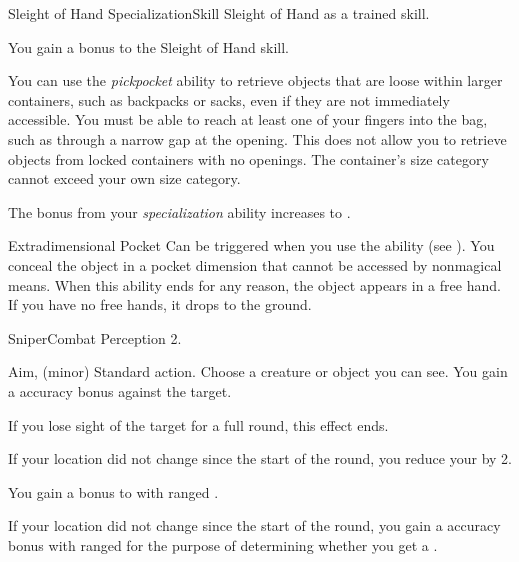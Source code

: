   \begin{feat}{Sleight of Hand Specialization}{Skill}
    \featpre Sleight of Hand as a trained skill.

     You gain a  bonus to the Sleight of Hand skill.

     You can use the \textit{pickpocket} ability to retrieve objects that are loose within larger containers, such as backpacks or sacks, even if they are not immediately accessible.
    You must be able to reach at least one of your fingers into the bag, such as through a narrow gap at the opening.
    This does not allow you to retrieve objects from locked containers with no openings.
    The container's size category cannot exceed your own size category.

     The bonus from your \textit{specialization} ability increases to .

    \begin{magicalattuneability}{Extradimensional Pocket}{}
      \abilityusagetime Can be triggered when you use the  ability (see ).
      \rankline
      You conceal the object in a pocket dimension that cannot be accessed by nonmagical means.
      When this ability ends for any reason, the object appears in a free hand.
      If you have no free hands, it drops to the ground.
    \end{magicalattuneability}
  \end{feat}

  \begin{feat}{Sniper}{Combat}
    \featpre Perception 2.

    \begin{sustainability}{Aim}{,  (minor)}
      \abilityusagetime Standard action.
      \rankline
      Choose a creature or object you can see.
      You gain a  accuracy bonus against the target.

      If you lose sight of the target for a full round, this effect ends.
    \end{sustainability}

     If your location did not change since the start of the round, you reduce your  by 2.

     You gain a  bonus to  with ranged .

     If your location did not change since the start of the round, you gain a  accuracy bonus with ranged  for the purpose of determining whether you get a .
  \end{feat}

